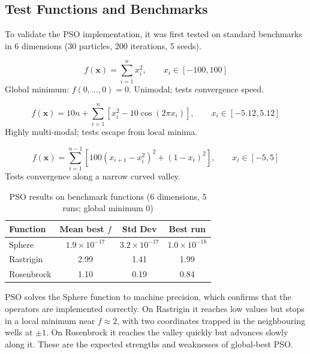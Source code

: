 \subsection{Test Functions and Benchmarks}

To validate the PSO implementation, it was first tested on standard benchmarks in 6 dimensions (30 particles, 200 iterations, 5 seeds).

\begin{equation}
f(\mathbf{x}) = \sum_{i=1}^{n} x_i^2, \qquad x_i \in [-100, 100]
\end{equation}
Global minimum: $f(0,\dots,0) = 0$. Unimodal; tests convergence speed.

\begin{equation}
f(\mathbf{x}) = 10n + \sum_{i=1}^{n}\left[x_i^2 - 10\cos(2\pi x_i)\right], \qquad x_i \in [-5.12, 5.12]
\end{equation}
Highly multi-modal; tests escape from local minima.

\begin{equation}
f(\mathbf{x}) = \sum_{i=1}^{n-1}\left[100(x_{i+1} - x_i^2)^2 + (1 - x_i)^2\right], \qquad x_i \in [-5, 5]
\end{equation}
Tests convergence along a narrow curved valley.

\begin{table}[H]
\centering
\caption{PSO results on benchmark functions (6 dimensions, 5 runs; global minimum 0)}
\begin{tabular}{|l|c|c|c|}
\hline
\textbf{Function} & \textbf{Mean best $f$} & \textbf{Std Dev} & \textbf{Best run} \\ \hline
Sphere & $1.9\times10^{-17}$ & $3.2\times10^{-17}$ & $1.0\times10^{-18}$ \\
Rastrigin & 2.99 & 1.41 & 1.99 \\
Rosenbrock & 1.10 & 0.19 & 0.84 \\ \hline
\end{tabular}
\end{table}

PSO solves the Sphere function to machine precision, which confirms that the operators are implemented correctly. On Rastrigin it reaches low values but stops in a local minimum near $f \approx 2$, with two coordinates trapped in the neighbouring wells at $\pm 1$. On Rosenbrock it reaches the valley quickly but advances slowly along it. These are the expected strengths and weaknesses of global-best PSO.

